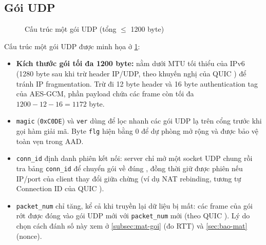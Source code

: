 \subsection{Gói UDP}
\label{subsec:goi}

\begin{figure}[H]
  \centering
  \caption{Cấu trúc một gói UDP (tổng $\le$ 1200 byte)}
  \label{fig:goi}
\end{figure}

Cấu trúc một gói UDP được minh họa ở \cref{fig:goi}:
\begin{itemize}
  \item \textbf{Kích thước gói tối đa 1200 byte:} nằm dưới MTU tối thiểu của IPv6 (1280 byte sau khi trừ header
        IP/UDP, theo khuyến nghị của QUIC \cite{rfc9000}) để tránh IP fragmentation. Trừ đi
        12 byte header và 16 byte authentication tag của AES-GCM, phần payload chứa các frame còn tối đa
        $1200 - 12 - 16 = 1172$ byte.
  \item \texttt{magic} (\texttt{0xC0DE}) và \texttt{ver} dùng để lọc nhanh các gói UDP lạ trên cổng trước khi gọi
        hàm giải mã. Byte \texttt{flg} hiện bằng 0 để dự phòng mở rộng và được bảo vệ toàn vẹn trong AAD.
  \item \texttt{conn\_id} định danh phiên kết nối: server chỉ mở một socket UDP chung rồi tra bảng \texttt{conn\_id}
        để chuyển gói về đúng , đồng thời giữ được phiên nếu IP/port của client thay đổi giữa chừng
        (ví dụ NAT rebinding, tương tự Connection ID của QUIC \cite{rfc9000}).
  \item \texttt{packet\_num} chỉ tăng, kể cả khi truyền lại dữ liệu bị mất: các frame của gói rớt được đóng vào gói
        UDP mới với \texttt{packet\_num} mới (theo QUIC \cite{rfc9000,rfc9002}). Lý do chọn cách đánh số này xem ở
        \cref{subsec:mat-goi} (đo RTT) và \cref{sec:bao-mat} (nonce).
\end{itemize}

